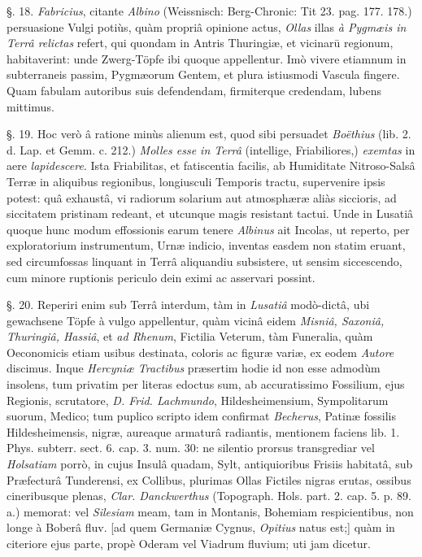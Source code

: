 \documentclass[a4paper, 11pt, oneside, polutonikogreek, german]{article}
\begin{document}
§. 18. \emph{Fabricius}, citante \emph{Albino} (Weissnisch: Berg-Chronic: Tit 23. pag. 177. 178.) persuasione Vulgi potiùs, quàm propriâ opinione actus, \emph{Ollas} illas \emph{à Pygmæis in Terrâ relictas} refert, qui quondam in Antris Thuringiæ, et vicinarū regionum, habitaverint: unde Zwerg-Töpfe ibi quoque appellentur. Imò vivere etiamnum in subterraneis passim, Pygmæorum Gentem, et plura istiusmodi Vascula fingere. Quam fabulam autoribus suis defendendam, firmiterque credendam, lubens mittimus.

§. 19. Hoc verò â ratione minùs alienum est, quod sibi persuadet \emph{Boëthius} (lib. 2. d. Lap. et Gemm. c. 212.) \emph{Molles esse in Terrâ} (intellige, Friabiliores,) \emph{exemtas} in aere \emph{lapidescere}. Ista Friabilitas, et fatiscentia facilis, ab Humiditate Nitroso-Salsâ Terræ in aliquibus regionibus, longiusculi Temporis tractu, supervenire ipsis potest: quâ exhaustâ, vi radiorum solarium aut atmosphæræ aliàs siccioris, ad siccitatem pristinam redeant, et utcunque magis resistant tactui. Unde in Lusatiâ quoque hunc modum effossionis earum tenere \emph{Albinus} ait Incolas, ut reperto, per exploratorium instrumentum, Urnæ indicio, inventas easdem non statim eruant, sed circumfossas linquant in Terrâ aliquandiu subsistere, ut sensim siccescendo, cum minore ruptionis periculo dein eximi ac asservari possint.

§. 20. Reperiri enim sub Terrâ interdum, tàm in \emph{Lusatiâ} modò-dictâ, ubi gewachsene Töpfe à vulgo appellentur, quàm vicinâ eidem \emph{Misniâ, Saxoniâ, Thuringiâ, Hassiâ}, et \emph{ad Rhenum}, Fictilia Veterum, tàm Funeralia, quàm Oeconomicis etiam usibus destinata, coloris ac figuræ variæ, ex eodem \emph{Autore} discimus. Inque \emph{Hercyniæ Tractibus} præsertim hodie id non esse admodùm insolens, tum privatim per literas edoctus sum, ab accuratissimo Fossilium, ejus Regionis, scrutatore, \emph{D. Frid. Lachmundo}, Hildesheimensium, Sympolitarum suorum, Medico; tum puplico scripto idem confirmat \emph{Becherus}, Patinæ fossilis Hildesheimensis, nigræ, aureaque armaturâ radiantis, mentionem faciens lib. 1. Phys. subterr. sect. 6. cap. 3. num. 30: ne silentio prorsus transgrediar vel \emph{Holsatiam} porrò, in cujus Insulâ quadam, Sylt, antiquioribus Frisiis habitatâ, sub Præfecturâ Tunderensi, ex Collibus, plurimas Ollas Fictiles nigras erutas, ossibus cineribusque plenas, \emph{Clar. Danckwerthus} (Topograph. Hols. part. 2. cap. 5. p. 89. a.) memorat: vel \emph{Silesiam} meam, tam in Montanis, Bohemiam respicientibus, non longe à Boberâ fluv. [ad quem Germaniæ Cygnus, \emph{Opitius} natus est;] quàm in citeriore ejus parte, propè Oderam vel Viadrum fluvium; uti jam dicetur.
\end{document}
